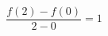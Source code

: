 \documentclass[preview]{standalone}
\begin{document}
\begin{align*}
\dfrac{f(2) - f(0)}{2 - 0} = 1
\end{align*}
\end{document}
